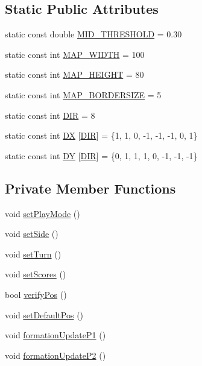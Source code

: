 \subsection*{Static Public Attributes}
\begin{DoxyCompactItemize}
\item 
static const double \hyperlink{classInterpreter_ad1c3ae1b11b176d50b5e8dcbf4b8b09e}{MID\_\-THRESHOLD} = 0.30
\item 
static const int \hyperlink{classInterpreter_a30c4dceff341b5e7cd36fdaba21aeaa9}{MAP\_\-WIDTH} = 100
\item 
static const int \hyperlink{classInterpreter_abda6b21064d50acd844bda3ed551e263}{MAP\_\-HEIGHT} = 80
\item 
static const int \hyperlink{classInterpreter_a0e360d1c91a1328af41fd9a4ede5eaef}{MAP\_\-BORDERSIZE} = 5
\item 
static const int \hyperlink{classInterpreter_a13a73024c4a1e62845a91f686adcd919}{DIR} = 8
\item 
static const int \hyperlink{classInterpreter_ac3d8a1b37737331fbfe7f4cea33cbd04}{DX} \mbox{[}\hyperlink{classInterpreter_a13a73024c4a1e62845a91f686adcd919}{DIR}\mbox{]} = \{1, 1, 0, -\/1, -\/1, -\/1, 0, 1\}
\item 
static const int \hyperlink{classInterpreter_aafc38675c9cad6e87686598dfe9c5758}{DY} \mbox{[}\hyperlink{classInterpreter_a13a73024c4a1e62845a91f686adcd919}{DIR}\mbox{]} = \{0, 1, 1, 1, 0, -\/1, -\/1, -\/1\}
\end{DoxyCompactItemize}
\subsection*{Private Member Functions}
\begin{DoxyCompactItemize}
\item 
void \hyperlink{classInterpreter_aef305fb79ee56df26f7fa4d2fb1be84e}{setPlayMode} ()
\item 
void \hyperlink{classInterpreter_a7bcbe98cfcb820392776af34325af2f4}{setSide} ()
\item 
void \hyperlink{classInterpreter_a976750d75dbde52f1de42b189bc3db0d}{setTurn} ()
\item 
void \hyperlink{classInterpreter_ad947f5a13997ba025515d65be4ca13a3}{setScores} ()
\item 
bool \hyperlink{classInterpreter_af8a7d8d22248eefd43de2ea08fc61b0f}{verifyPos} ()
\item 
void \hyperlink{classInterpreter_aa64d5e94c2cdee7696135a360f51926b}{setDefaultPos} ()
\item 
void \hyperlink{classInterpreter_a0191e3c65605b0ebadb696cf540951ee}{formationUpdateP1} ()
\item 
void \hyperlink{classInterpreter_aa722fe96daeb04f61352559e6d29dda6}{formationUpdateP2} ()
\end{DoxyCompactItemize}
